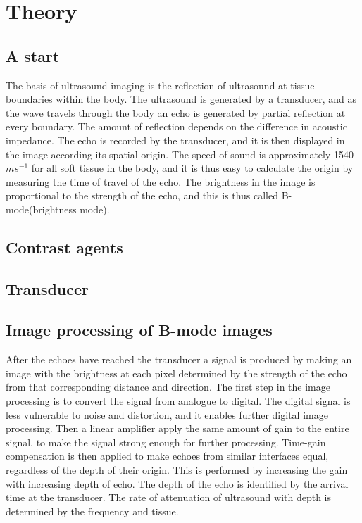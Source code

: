 \section{Theory}
\subsection{A start}
The basis of ultrasound imaging is the reflection of ultrasound at tissue boundaries within the body. The ultrasound is generated by a transducer, and as the wave travels through the body an echo is generated by partial reflection at every boundary. The amount of reflection depends on the difference in acoustic impedance. The echo is recorded by the transducer, and it is then displayed in the image according its spatial origin. The speed of sound is approximately 1540 $m s^{-1}$ for all soft tissue in the body, and it is thus easy to calculate the origin by measuring the time of travel of the echo.  The brightness in the image is proportional to the strength of the echo, and this is thus called B-mode(brightness mode). 



\subsection{Contrast agents}


\subsection{Transducer}


\subsection{Image processing of B-mode images}
After the echoes have reached the transducer a signal is produced by making an image with the brightness at each pixel determined by the strength of the echo from that corresponding distance and direction. The first step in the image processing is to convert the signal from analogue to digital. The digital signal is less vulnerable to noise and distortion, and it enables further digital image processing. Then a linear amplifier apply the same amount of gain to the entire signal, to make the signal strong enough for further processing. Time-gain compensation is then applied to make echoes from similar interfaces equal, regardless of the depth of their origin. This is performed by increasing the gain with increasing depth of echo. The depth of the echo is identified by the arrival time at the transducer. The rate of attenuation of ultrasound with depth is determined by the frequency and tissue.

